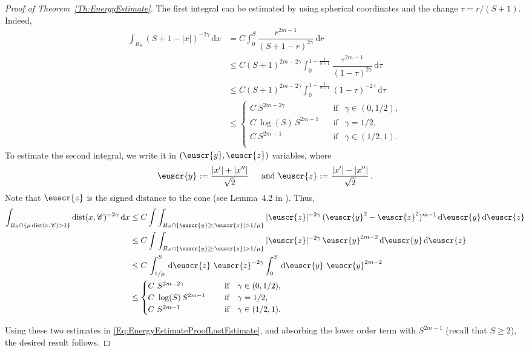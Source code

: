 \documentclass[12pt,reqno]{amsart}
\theoremstyle{definition}
\theoremstyle{remark}
\newcommand{\ccal}{\mathscr{C}}
\newcommand{\s}{\gamma}
\renewcommand{\d}{\,\mathrm{d}} %
\DeclareMathOperator{\dist}{dist}
\numberwithin{equation}{section}
\begin{document}
\begin{proof}[Proof of Theorem~\ref{Th:EnergyEstimate}]
	
	The first integral can be estimated by using spherical coordinates and the change $\tau = r/(S+1)$. Indeed,
	\begin{align*}
	\int_{B_S} \left( S+1-|x| \right)^{-2\s} \d x & = C \int_0^S \dfrac{r^{2m-1}}{(S+1-r)^{2\s}} \d r \\
	& \leq C (S+1)^{2m - 2\s}\int_0^{1 - \frac{1}{S+1}} \dfrac{\tau^{2m-1}}{(1-\tau)^{2\s}} \d \tau\\
	&\leq C (S+1)^{2m - 2\s}\int_0^{1 - \frac{1}{S+1}} (1-\tau)^{-2\s} \d \tau \\
	& \leq \begin{cases}
	C \ S^{2m-2\s}\ \ \ \ &\textrm{if } \ \ \s\in(0,1/2),\\
	C\ \log(S)\,S^{2m-1}\ \ \ \ &\textrm{if } \ \ \s=1/2,\\
	C \ S^{2m-1}\ \ \ \ &\textrm{if } \ \ \s\in(1/2,1).\\
	\end{cases}
	\end{align*}
	To estimate the second integral, we write it in $(\euscr{y},\euscr{z})$ variables, where
	$$
	\euscr{y} := \dfrac{|x'|+|x''|}{\sqrt{2}} \, \quad \text{ and } \euscr{z} := \dfrac{|x'|-|x''|}{\sqrt{2}}\,.
	$$
	Note that $\euscr{z}$ is the signed distance to the cone (see Lemma~4.2 in \cite{CabreTerraI}). Thus,
	\begin{align*}
	\int_{B_{S}\cap \{\mu \dist(x,\ccal)>1\}} \dist(x,\ccal)^{-2\s} \d x &\leq C \int \int_{B_{S}\cap \{\euscr{y}\geq|\euscr{z}|>1/\mu\}} |\euscr{z}|^{-2\s} \, (\euscr{y}^2-\euscr{z}^2)^{m-1} \d \euscr{y}\d \euscr{z} \\
	& \leq C \int \int_{B_{S}\cap \{\euscr{y}\geq|\euscr{z}|>1/\mu\}} |\euscr{z}|^{-2\s} \, \euscr{y}^{2m-2} \d \euscr{y}\d \euscr{z} \\
	& \leq C\, \int_{1/\mu}^S \d \euscr{z}   \ \euscr{z}^{-2\s}\int_0^S \d \euscr{y}\  \euscr{y}^{2m-2} \\
	& \leq \begin{cases}
	C \ S^{2m-2\s}\ \ \ \ &\textrm{if } \ \ \s\in(0,1/2),\\
	C\ \log(S)\,S^{2m-1}\ \ \ \ &\textrm{if } \ \ \s=1/2,\\
	C \ S^{2m-1}\ \ \ \ &\textrm{if } \ \ \s\in(1/2,1).\\
	\end{cases}
	\end{align*}
	
	Using these two estimates in \eqref{Eq:EnergyEstimateProofLastEstimate}, and absorbing the lower order term with $S^{2m-1}$ (recall that $S\geq 2$), the desired result follows.
\end{proof}
\end{document}
